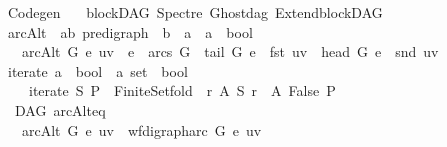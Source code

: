 %
\begin{isabellebody}%
%
%
\isadelimtheory
\isanewline
\isanewline
\isanewline
%
\endisadelimtheory
%
\isatagtheory
{}\isamarkupfalse%
\ Codegen\isanewline
\ \ \ blockDAG\ Spectre\ Ghostdag\ Extend{\isacharunderscore}{\kern0pt}blockDAG\isanewline
{}%
\endisatagtheory
{\isafoldtheory}%
%
\isadelimtheory
%
\endisadelimtheory
%
\isadelimdocument
%
\endisadelimdocument
%
\isatagdocument
%
\isamarkuptrue%
%
\endisatagdocument
{\isafolddocument}%
%
\isadelimdocument
%
\endisadelimdocument
{}\isamarkupfalse%
\ arcAlt{\isacharcolon}{\kern0pt}{\isacharcolon}{\kern0pt}\ \ {\isachardoublequoteopen}{\isacharparenleft}{\kern0pt}{\isacharprime}{\kern0pt}a{\isacharcomma}{\kern0pt}{\isacharprime}{\kern0pt}b{\isacharparenright}{\kern0pt}\ pre{\isacharunderscore}{\kern0pt}digraph\ {\isasymRightarrow}\ {\isacharprime}{\kern0pt}b\ {\isasymRightarrow}\ {\isacharprime}{\kern0pt}a\ {\isasymtimes}\ {\isacharprime}{\kern0pt}a\ {\isasymRightarrow}\ bool{\isachardoublequoteclose}\isanewline
\ \ \ {\isachardoublequoteopen}arcAlt\ G\ e\ uv\ {\isacharequal}{\kern0pt}\ {\isacharparenleft}{\kern0pt}e\ {\isasymin}\ arcs\ G\ {\isasymand}\ tail\ G\ e\ {\isacharequal}{\kern0pt}\ fst\ uv\ {\isasymand}\ head\ G\ e\ {\isacharequal}{\kern0pt}\ snd\ uv{\isacharparenright}{\kern0pt}{\isachardoublequoteclose}\isanewline
\isanewline
{}\isamarkupfalse%
\ iterate{\isacharcolon}{\kern0pt}{\isacharcolon}{\kern0pt}\ {\isachardoublequoteopen}{\isacharparenleft}{\kern0pt}{\isacharprime}{\kern0pt}a\ {\isasymRightarrow}\ bool{\isacharparenright}{\kern0pt}\ {\isasymRightarrow}\ {\isacharprime}{\kern0pt}a\ set\ {\isasymRightarrow}\ bool{\isachardoublequoteclose}\isanewline
\ \ \ \ {\isachardoublequoteopen}iterate\ S\ P\ {\isacharequal}{\kern0pt}\ Finite{\isacharunderscore}{\kern0pt}Set{\isachardot}{\kern0pt}fold\ {\isacharparenleft}{\kern0pt}{\isasymlambda}\ r\ A{\isachardot}{\kern0pt}\ S\ r\ {\isasymand}\ A{\isacharparenright}{\kern0pt}\ False\ P\ {\isachardoublequoteclose}\isanewline
\isanewline
{}\isamarkupfalse%
\ {\isacharparenleft}{\kern0pt}\ DAG{\isacharparenright}{\kern0pt}\ arcAlt{\isacharunderscore}{\kern0pt}eq{\isacharcolon}{\kern0pt}\ \ \ \ \ \ \ \ \ \ \ \ \ \ \ \ \ \ \ \ \ \isanewline
\ \ \ {\isachardoublequoteopen}arcAlt\ G\ e\ uv\ {\isacharequal}{\kern0pt}\ wf{\isacharunderscore}{\kern0pt}digraph{\isachardot}{\kern0pt}arc\ G\ e\ uv{\isachardoublequoteclose}\isanewline

\end{isabellebody}
